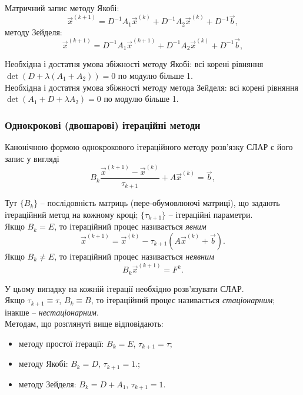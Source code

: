 Матричний запис методу Якобі:
\[ \vec x^{(k+1)} = D^{-1} A_1 \vec x^{(k)} + D^{-1} A_2 \vec x^{(k)} + D^{-1} \vec b,\]
методу Зейделя:
\[ \vec x^{(k+1)} = D^{-1} A_1 \vec x^{(k+1)} + D^{-1} A_2 \vec x^{(k)} + D^{-1} \vec b,\]

Необхідна і достатня умова збіжності методу Якобі: всі корені рівняння $\det(D + \lambda(A_1 + A_2 )) = 0$ по модулю більше 1. \\

Необхідна і достатня умова збіжності методу метода Зейделя: всі корені рівняння $\det(A_1 + D + \lambda A_2) = 0$ по модулю більше 1.

\subsubsection{Однокрокові (двошарові) ітераційні методи}

Канонічною формою однокрокового ітераційного методу розв'язку СЛАР є його запис у вигляді
\begin{equation}
	\label{eq:4.11}
	B_k \dfrac{\vec x^{(k+1)} - \vec x^{(k)}}{\tau_{k+1}} + A \vec x^{(k)} = \vec b,
\end{equation}

Тут $\{B_k\}$ -- послідовність матриць (пере-обумовлюючі матриці), що задають ітераційний метод на кожному кроці; $\{\tau_{k+1}\}$ -- ітераційні параметри. \\

Якщо $B_k = E$, то ітераційний процес називається \textit{явним}
\[ \vec x^{(k+1)} = \vec x^{(k)} - \tau_{k+1} (A \vec x^{(k)} + \vec b). \]
Якщо $B_k \ne E$, то ітераційний процес називається \textit{неявним}
\[ B_k \vec x^{(k+1)} = F^k. \]

У цьому випадку на кожній ітерації необхідно розв'язувати СЛАР. \\

Якщо $\tau_{k+1} \equiv \tau$, $B_k \equiv B$, то ітераційний процес називається \textit{стаціонарним}; інакше -- \textit{нестаціонарним}. \\

Методам, що розглянуті вище відповідають:
\begin{itemize}
	\item методу простої ітерації: $B_k = E$, $\tau_{k+1} = \tau$;
	\item методу Якобі: $B_k = D$, $\tau_{k+1} = 1$.;
	\item методу Зейделя: $B_k = D + A_1$, $\tau_{k+1} = 1$.
\end{itemize}

